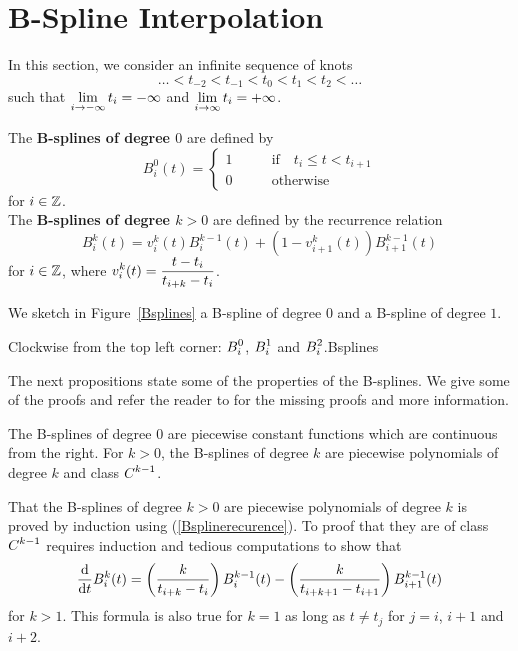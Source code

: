 \section{B-Spline Interpolation} \label{BSI}

In this section, we consider an infinite sequence of knots
\[
\ldots < t_{-2} < t_{-1} < t_0 < t_1 < t_2 < \ldots
\]
such that $\DS \lim_{i\rightarrow -\infty} t_i = -\infty$ and
$\DS \lim_{i\rightarrow \infty} t_i = +\infty$.

\begin{defn}
The {\bfseries B-splines of degree $0$}
are defined by
\[
B_i^0(t) = \begin{cases}
1 & \qquad \text{if} \quad t_i \leq t < t_{i+1} \\
0 & \qquad \text{otherwise}
\end{cases}
\]
for $i\in \ZZ$.\\
The {\bfseries B-splines of degree $k>0$}
are defined by the recurrence relation
\begin{equation}\label{Bsplinerecurence}
B_i^k(t) = v_i^k(t) B_i^{k-1}(t)
+ \left( 1-v_{i+1}^k(t) \right) B_{i+1}^{k-1}(t)
\end{equation}
for $i\in \ZZ$, where
$\DS v_i^k(t) = \frac{t-t_i}{t_{i+k}-t_i}$.
\end{defn}

We sketch in Figure~\ref{Bsplines} a B-spline of degree $0$ and a
B-spline of degree $1$.

{Clockwise from the top left corner: $\DS B_i^0$,
$\DS B_i^1$ and $\DS B_i^2$.}{Bsplines}

The next propositions state some of the properties of the B-splines.
We give some of the proofs and refer the reader to \cite{KC} for the
missing proofs and more information.

\begin{prop}
The B-splines of degree $0$ are piecewise constant functions which are
continuous from the right.  For $k>0$, the B-splines of degree $k$ are
piecewise polynomials of degree $k$ and class $\DS C^{k-1}$.
\label{BSplineCkm1}
\end{prop}

That the B-splines of degree $k>0$ are piecewise polynomials of degree
$k$ is proved by induction using (\ref{Bsplinerecurence}).   To proof
that they are of class $\DS C^{k-1}$ requires induction and tedious
computations to show that
\begin{equation}\label{derBspline}
  \dfdx{B_i^k(t)}{t} =
  \left( \frac{k}{t_{i+k}-t_i} \right) B_i^{k-1}(t)
- \left( \frac{k}{t_{i+k+1}-t_{i+1}} \right) B_{i+1}^{k-1}(t)
\end{equation}
for $k>1$.  This formula is also true for $k=1$ as long as $t\neq t_j$
for $j=i$, $i+1$ and $i+2$.

